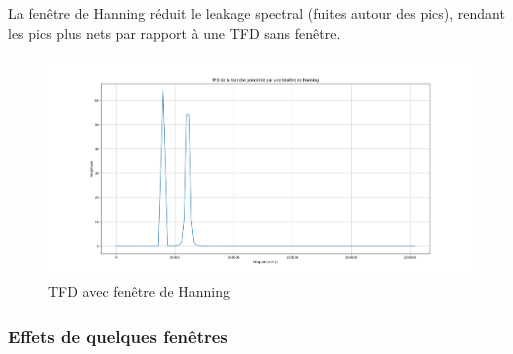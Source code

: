 La fenêtre de Hanning réduit le leakage spectral (fuites autour des pics), rendant les pics plus nets par rapport à une TFD sans fenêtre.\\

\begin{figure}[h!]
    \centering
    \includegraphics[width=18cm]{screenshots/TFD_hanning_signal.png}
    \caption{TFD avec fenêtre de Hanning}
\end{figure}

\subsubsection{Effets de quelques fenêtres}



